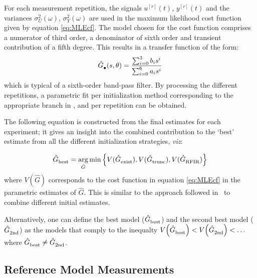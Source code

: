 For each measurement repetition, the signals $u^{[r]}(t)$, $y^{[r]}(t)$ and the variances $\sigma_U^2(\omega)$, $\sigma_Y^2(\omega)$ are used in the maximum likelihood cost function given by equation \eqref{eq:MLEcf}.
The model chosen for the cost function comprises a numerator of third order, a denominator of sixth order and transient contribution of a fifth degree. This results in a transfer function of the form:
\begin{equation}
  \hat{G}_{\mathrm{\bullet}}^{\mathrm{}}(s,\theta) = \frac{\sum_{i=0}^3 b_i s^i}{\sum_{i=0}^6 a_i s^i}
\end{equation}
which is typical of a sixth-order band-pass filter.
By processing the different repetitions, a parametric fit per initialization method corresponding to the appropriate branch in , and per repetition can be obtained. 


The following equation is constructed from the final estimates for each experiment; it gives an insight into the combined contribution to the `best' estimate from all the different initialization strategies, \emph{viz}:

\begin{equation}\label{eq:selectBest}
  \hat{G}_{\mathrm{best}}^{\mathrm{}} = 
    \operatorname*{arg}_{\hat{G}} 
    \min 
    \left\{ 
      V(\hat{G}_{\mathrm{exist}}^{\mathrm{}}),
      V(\hat{G}_{\mathrm{trunc}}^{\mathrm{}}),
      V(\hat{G}_{\mathrm{RFIR}}^{\mathrm{}})
    \right\}
\end{equation}
where $V(\hat{G})$ corresponds to the cost function in equation \eqref{eq:MLEcf} in the parametric estimates of $\hat{G}$.
This is similar to the approach followed in~\citep{FDIDENT} to combine different initial estimates.

Alternatively, one can define the best model ($\hat{G}_{\mathrm{best}}^{\mathrm{}}$) and the second best model ($\hat{G}_{\mathrm{2nd}}^{\mathrm{}}$) as the models that comply to the inequalty
$
  V_{}\left(\hat{G}_{\mathrm{best}}^{\mathrm{}}\right) < 
  V_{}\left( \hat{G}_{\mathrm{2nd}}^{\mathrm{}} \right) < 
  \ldots
$
where $\hat{G}_{\mathrm{best}}^{\mathrm{}} \neq \hat{G}_{\mathrm{2nd}}^{\mathrm{}}$.

\subsection{Reference Model Measurements}

